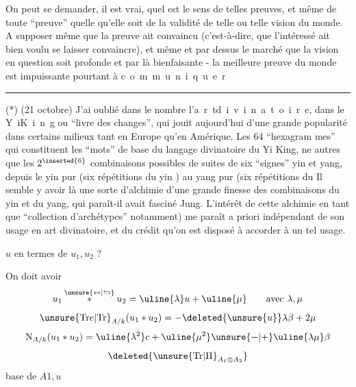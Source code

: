 On peut se demander, il est vrai, quel est le sens de telles preuves, et
même de toute ``preuve'' quelle qu'elle soit de la validité de telle ou telle
vision du monde. A supposer même que la preuve ait convaincu (c'est-à-dire,
que l'intéressé ait bien voulu se laisser convaincre), et même et par dessus
le marché\unsure{\inserted{,}} que la vision en question soit profonde et par là\unsure{\inserted{,}} bienfaisante -
la meilleure preuve du monde est impuissante pourtant à \mbox{c o m m u n i q u e r}
\par\noindent\rule{0.24\linewidth}{0.3pt}\par
(*) (21 octobre) J'ai oublié dans le nombre l'\mbox{a r t\quad d i v i n a t o i r e},
dans le \mbox{Y i\quad K i n g} ou ``livre des changes'', qui jouit aujourd'hui d'une grande
popularité dans certains milieux tant en Europe qu'en Amérique. Les \unsure{$\cdot$}64 ``hexagram\unsure{-}
mes'' qui constituent les ``mots'' de base du langage divinatoire du Yi King, ne 
autres que les $2^{\inserted{6}}$ combinaisons possibles de suites de six ``signes'' yin et yang,
depuis le yin pur (six répétitions du yin ) au yang pur (six répétitions du 
Il semble y avoir là une sorte d'alchimie d'une grande finesse des combinaisons
du yin et du yang, qui \inserted{(}paraît-il\inserted{)} avait fasciné Jung. L'intérêt de cette alchimie
\inserted{(}en tant que ``collection d'archétypes'' notamment) me paraît a priori indépendant
de son usage en art divinatoire, et du crédit qu'on est disposé à accorder à
un tel usage.

$u$  en termes de $u_1,u_2$ ?

 
On doit avoir
\[u_1\overset{\unsure{\leftrightarrow|\leftrightarrows}}{*}u_2=\uline{\lambda}u+\uline{\mu}\qquad\text{avec }\lambda,\mu\]
\[\unsure{\mathrm{Tr}e|\mathrm{Tr}}_{A/k}(u_1*u_2)=-\deleted{\unsure{u}}\lambda\beta+2\mu\]
\[\mathrm{N}_{A/k}(u_1*u_2)=\uline{\lambda^2}c+\uline{\mu^2}\unsure{-|+}\uline{\lambda\mu}\beta\]
\[\deleted{\unsure{\mathrm{Tr}|\Pi}_{A_1\otimes A_2}}\]
base de $A$\qquad $1,u$

